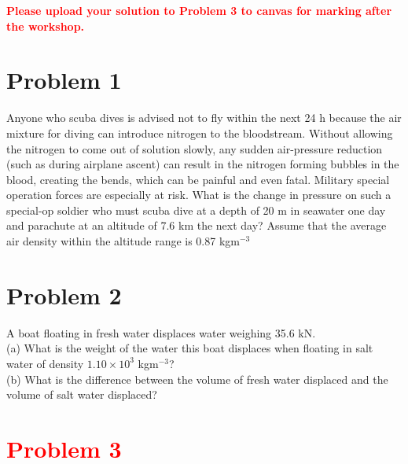 \documentclass[11pt]{article}
\begin{document}
\noindent
\textbf{\textcolor{red}{Please upload your solution to Problem 3 to canvas for marking after the workshop.}}\\

\section*{Problem 1}

Anyone who scuba dives is advised not to fly within the next 24 h because the air mixture for diving can introduce nitrogen to the bloodstream. Without allowing the nitrogen to come out of solution slowly, any sudden air-pressure reduction (such as during airplane ascent) can result in the nitrogen forming bubbles in the blood, creating the bends, which can be painful and even fatal. Military special operation forces are especially at risk. What is the change in pressure on such a special-op soldier who must scuba dive at a depth of 20 m in seawater one day and parachute at an altitude of 7.6 km the next day? Assume that the average air density within the altitude range is 0.87 kgm$^{-3}$

\noindent

\section*{Problem 2}

A boat floating in fresh water displaces water weighing 35.6 kN.\\
 (a) What is the weight of the water this boat displaces when floating in salt water of density $1.10 \times 10^3$ kgm$^{-3}$? \\
 (b) What is the difference between the volume of fresh water displaced and the volume of salt water displaced?


\section*{\textcolor{red}{Problem 3}}
\end{document}
